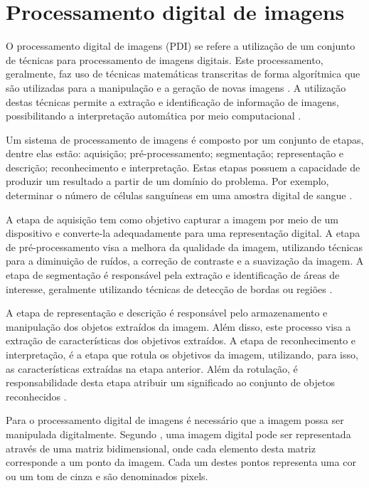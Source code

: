 \documentclass[
	12pt,				%
	oneside,			%
	a4paper,			%
	english,			%
	french,				%
	spanish,			%
	brazil,				%
	]{abntex2}
\begin{document}
\chapter{Processamento digital de imagens}

O  processamento digital de imagens (PDI) se refere a utilização de um conjunto de técnicas para processamento de imagens digitais. Este processamento, geralmente, faz uso de técnicas matemáticas transcritas de forma algorítmica que são utilizadas para a manipulação e a geração de novas imagens \cite{gonzalesWoods:2008}. A utilização destas técnicas permite a extração e identificação de informação de imagens, possibilitando a interpretação automática por meio computacional \cite{pedriniSchwartz:2008}.

Um sistema de processamento de imagens é composto por um conjunto de etapas, dentre elas estão: aquisição; pré-processamento; segmentação; representação e descrição; reconhecimento e interpretação. Estas etapas possuem a capacidade de produzir um resultado a partir de um domínio do problema. Por exemplo, determinar o número de células sanguíneas em uma amostra digital de sangue \cite{pedriniSchwartz:2008}.

A etapa de aquisição tem como objetivo capturar a imagem por meio de um dispositivo e converte-la adequadamente para uma representação digital. A etapa de pré-processamento visa a melhora da qualidade da imagem, utilizando técnicas para a diminuição de ruídos, a correção de contraste e a suavização da imagem. A etapa de segmentação é responsável pela extração e identificação de áreas de interesse, geralmente utilizando técnicas de detecção de bordas ou regiões \cite{pedriniSchwartz:2008}.

A etapa de representação e descrição é responsável  pelo armazenamento e manipulação dos objetos extraídos da imagem. Além disso, este processo visa a extração de características dos objetivos extraídos. A etapa de reconhecimento e interpretação, é a etapa que rotula os objetivos da imagem, utilizando, para isso, as características extraídas na etapa anterior. Além da rotulação, é responsabilidade desta etapa atribuir um significado ao conjunto de objetos reconhecidos \cite{pedriniSchwartz:2008}. 

Para o processamento digital de imagens é necessário que a imagem possa ser manipulada digitalmente. Segundo \citet{pedriniSchwartz:2008}, uma imagem digital pode ser representada através de uma matriz bidimensional, onde cada elemento desta matriz corresponde a um ponto da imagem. Cada um destes pontos representa uma cor ou um tom de cinza e são denominados pixels. 
\end{document}
